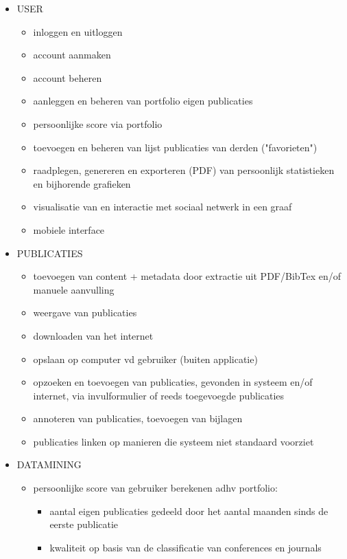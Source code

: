 \documentclass{article}
\begin{document}
\begin{itemize}
    \item USER
    \begin{itemize}
        \item inloggen en uitloggen 
        \item account aanmaken
        \item account beheren 
        \item aanleggen en beheren van portfolio eigen publicaties
        \item persoonlijke score via portfolio
	\item toevoegen en beheren van lijst publicaties van derden ("favorieten")
	\item raadplegen, genereren en exporteren (PDF) van persoonlijk statistieken en bijhorende grafieken
	\item visualisatie van en interactie met sociaal netwerk in een graaf
	\item mobiele interface
    \end{itemize}
    \item PUBLICATIES 
    \begin{itemize}
    \item toevoegen van content + metadata door extractie uit PDF/BibTex en/of manuele aanvulling
    \item weergave van publicaties 
    \item downloaden van het internet
    \item opslaan op computer vd gebruiker (buiten applicatie)
    \item opzoeken en toevoegen van publicaties, gevonden in systeem en/of internet, via invulformulier of reeds toegevoegde publicaties
	\item annoteren van publicaties, toevoegen van bijlagen 
	\item publicaties linken op manieren die systeem niet standaard voorziet
    \end{itemize}
    \item DATAMINING 
    \begin{itemize}
    \item persoonlijke score van gebruiker berekenen adhv portfolio: 
    	\begin{itemize}
    		\item aantal eigen publicaties gedeeld door het aantal maanden sinds de eerste publicatie
   		 \item kwaliteit op basis van de classificatie van conferences en journals

\end{itemize}
\end{itemize}
\end{itemize}
\end{document}
